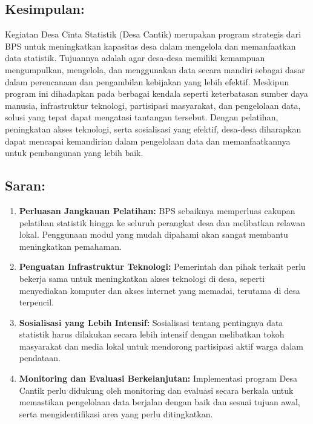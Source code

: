 \subsection*{Kesimpulan:}

Kegiatan Desa Cinta Statistik (Desa Cantik) merupakan program strategis dari BPS untuk meningkatkan kapasitas desa dalam mengelola dan memanfaatkan data statistik. Tujuannya adalah agar desa-desa memiliki kemampuan mengumpulkan, mengelola, dan menggunakan data secara mandiri sebagai dasar dalam perencanaan dan pengambilan kebijakan yang lebih efektif. Meskipun program ini dihadapkan pada berbagai kendala seperti keterbatasan sumber daya manusia, infrastruktur teknologi, partisipasi masyarakat, dan pengelolaan data, solusi yang tepat dapat mengatasi tantangan tersebut. Dengan pelatihan, peningkatan akses teknologi, serta sosialisasi yang efektif, desa-desa diharapkan dapat mencapai kemandirian dalam pengelolaan data dan memanfaatkannya untuk pembangunan yang lebih baik.

\subsection*{Saran:}

\begin{enumerate}[label=\textbf{\arabic*.}]
  \item \textbf{Perluasan Jangkauan Pelatihan:} BPS sebaiknya memperluas cakupan pelatihan statistik hingga ke seluruh perangkat desa dan melibatkan relawan lokal. Penggunaan modul yang mudah dipahami akan sangat membantu meningkatkan pemahaman.
  \item \textbf{Penguatan Infrastruktur Teknologi:} Pemerintah dan pihak terkait perlu bekerja sama untuk meningkatkan akses teknologi di desa, seperti menyediakan komputer dan akses internet yang memadai, terutama di desa terpencil.
  \item \textbf{Sosialisasi yang Lebih Intensif:} Sosialisasi tentang pentingnya data statistik harus dilakukan secara lebih intensif dengan melibatkan tokoh masyarakat dan media lokal untuk mendorong partisipasi aktif warga dalam pendataan.
  \item \textbf{Monitoring dan Evaluasi Berkelanjutan:} Implementasi program Desa Cantik perlu didukung oleh monitoring dan evaluasi secara berkala untuk memastikan pengelolaan data berjalan dengan baik dan sesuai tujuan awal, serta mengidentifikasi area yang perlu ditingkatkan.
\end{enumerate}
